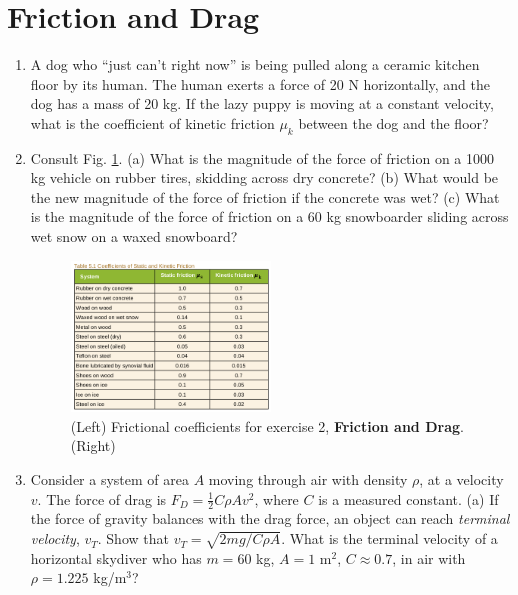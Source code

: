 \documentclass[10pt]{article}
\begin{document}
\section{Friction and Drag}
\begin{enumerate}
\item A dog who ``just can't right now'' is being pulled along a ceramic kitchen floor by its human.  The human exerts a force of 20 N horizontally, and the dog has a mass of 20 kg.  If the lazy puppy is moving at a constant velocity, what is the coefficient of kinetic friction $\mu_k$ between the dog and the floor? \\ \vspace{2cm}
\item Consult Fig. \ref{fig:coeff}. (a) What is the magnitude of the force of friction on a 1000 kg vehicle on rubber tires, skidding across dry concrete? (b) What would be the new magnitude of the force of friction if the concrete was wet? (c) What is the magnitude of the force of friction on a 60 kg snowboarder sliding across wet snow on a waxed snowboard? \\ \vspace{2cm}
\begin{figure}
\centering
\includegraphics[width=0.5\textwidth]{figures/coefficients.png}
\caption{\label{fig:coeff} (Left) Frictional coefficients for exercise 2, \textbf{Friction and Drag}. (Right) }
\end{figure}
\item Consider a system of area $A$ moving through air with density $\rho$, at a velocity $v$.  The force of drag is $F_D = \frac{1}{2}C\rho A v^2$, where $C$ is a measured constant.  (a) If the force of gravity balances with the drag force, an object can reach \textit{terminal velocity}, $v_{T}$.  Show that $v_T = \sqrt{2mg/C\rho A}$.  What is the terminal velocity of a horizontal skydiver who has $m=60$ kg, $A=1$ m$^2$, $C \approx 0.7$, in air with $\rho=1.225$ kg/m$^3$?
\end{enumerate}
\end{document}

